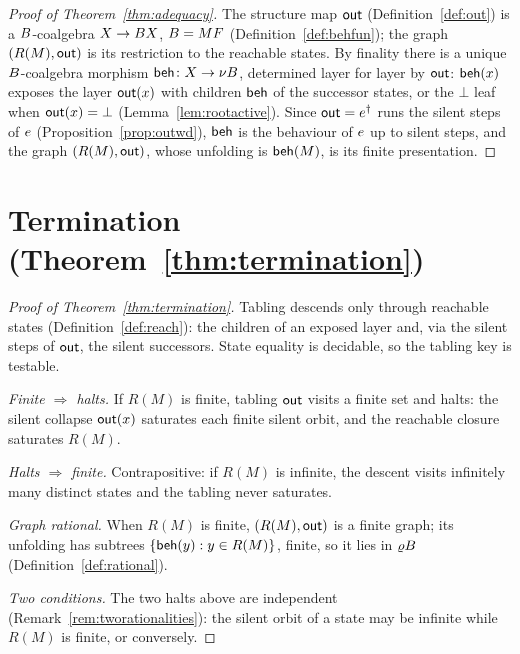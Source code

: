 \begin{proof}[Proof of Theorem~\ref{thm:adequacy}]
  The structure map $\mathsf{out}$ (Definition~\ref{def:out}) is a $B$-coalgebra $X \to B X$, $B = MF$
  (Definition~\ref{def:behfun}); the graph $(R(M),\mathsf{out})$ is its restriction to the reachable states. By
  finality there is a unique $B$-coalgebra morphism $\mathsf{beh} \colon X \to \nu B$, determined layer
  for layer by $\mathsf{out}$: $\mathsf{beh}(x)$ exposes the layer $\mathsf{out}(x)$ with children $\mathsf{beh}$ of the successor
  states, or the $\bot$ leaf when $\mathsf{out}(x) = \bot$ (Lemma~\ref{lem:rootactive}). Since
  $\mathsf{out} = e^{\dagger}$ runs the silent steps of $e$ (Proposition~\ref{prop:outwd}), $\mathsf{beh}$ is
  the behaviour of $e$ up to silent steps, and the graph $(R(M),\mathsf{out})$, whose unfolding is
  $\mathsf{beh}(M)$, is its finite presentation.
\end{proof}

\section{Termination (Theorem~\ref{thm:termination})}\label{app:termination}
\begin{proof}[Proof of Theorem~\ref{thm:termination}]
  Tabling descends only through reachable states (Definition~\ref{def:reach}): the children of an
  exposed layer and, via the silent steps of $\mathsf{out}$, the silent successors. State equality is decidable,
  so the tabling key is testable.

  \emph{Finite $\Rightarrow$ halts.} If $R(M)$ is finite, tabling $\mathsf{out}$ visits a finite set and halts:
  the silent collapse $\mathsf{out}(x)$ saturates each finite silent orbit, and the reachable closure saturates
  $R(M)$.

  \emph{Halts $\Rightarrow$ finite.} Contrapositive: if $R(M)$ is infinite, the descent visits
  infinitely many distinct states and the tabling never saturates.

  \emph{Graph rational.} When $R(M)$ is finite, $(R(M),\mathsf{out})$ is a finite graph; its unfolding has
  subtrees $\{\mathsf{beh}(y) : y \in R(M)\}$, finite, so it lies in $\varrho B$
  (Definition~\ref{def:rational}).

  \emph{Two conditions.} The two halts above are independent (Remark~\ref{rem:tworationalities}): the
  silent orbit of a state may be infinite while $R(M)$ is finite, or conversely.
\end{proof}

